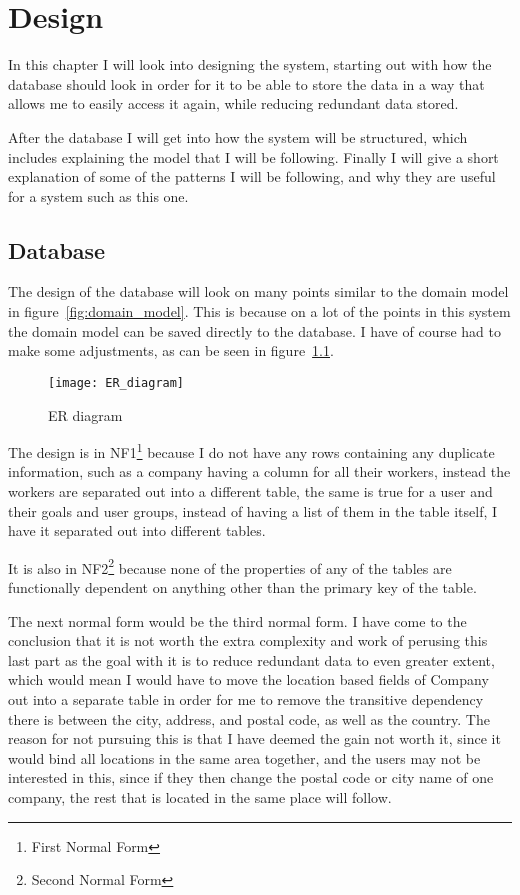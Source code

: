 \chapter{Design}
\label{chap:Design}
In this chapter I will look into designing the system, starting out with how the database should look in order for it to be able to store the data in a way that allows me to easily access it again, while reducing redundant data stored.

After the database I will get into how the system will be structured, which includes explaining the model that I will be following. Finally I will give a short explanation of some of the patterns I will be following, and why they are useful for a system such as this one.

\section{Database}
\label{sec:Database}
The design of the database will look on many points similar to the domain model in figure~\ref{fig:domain_model}. This is because on a lot of the points in this system the domain model can be saved directly to the database. I have of course had to make some adjustments, as can be seen in figure~\ref{fig:er_diagram}.

\begin{figure}
  \texttt{[image: ER\_diagram]}
  \caption{ER diagram}
  \label{fig:er_diagram}
\end{figure}

The design is in NF1\footnote{First Normal Form} because I do not have any rows containing any duplicate information, such as a company having a column for all their workers, instead the workers are separated out into a different table\cite[p.~430]{DB_systems}, the same is true for a user and their goals and user groups, instead of having a list of them in the table itself, I have it separated out into different tables.

It is also in NF2\footnote{Second Normal Form} because none of the properties of any of the tables are functionally dependent on anything other than the primary key of the table\cite[p.~434]{DB_systems}.

The next normal form would be the third normal form. I have come to the
conclusion that it is not worth the extra complexity and work of perusing this last part as the goal with it is to reduce redundant data to even greater extent, which would mean I would have to move the location based fields of Company out into a separate table in order for me to remove the transitive dependency\cite[p.~436]{DB_systems} there is between the city, address, and postal code, as well as the country. The reason for not pursuing this is that I have deemed the gain not worth it, since it would bind all locations in the same area together, and the users may not be interested in this, since if they then change the postal code or city name of one company, the rest that is located in the same place will follow.

